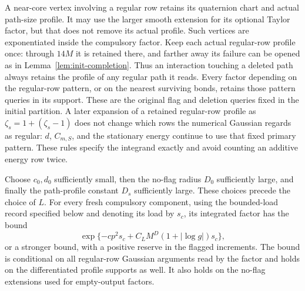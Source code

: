 A near-core vertex involving a regular row retains its quaternion chart
and actual path-size profile.  It may use the larger smooth extension
for its optional Taylor factor, but that does not remove its actual
profile.  Such vertices are exponentiated inside the compulsory factor.
Keep each actual regular-row profile once: through $14M$ it is retained
there, and farther away its failure can be opened as in
Lemma~\ref{lem:init-completion}.  Thus an interaction touching a deleted
path always retains the profile of any regular path it reads.  Every
factor depending on the regular-row pattern, or on the nearest surviving
bonds, retains those pattern queries in its support.  These are the original flag and deletion queries fixed in the initial
partition.  A later expansion of a retained regular-row profile as
$\zeta_s=1+(\zeta_s-1)$ does not change which rows the numerical
Gaussian regards as regular: $d$, $C_{m,S}$, and the stationary energy
continue to use that fixed primary pattern.  These rules specify the
integrand exactly and avoid counting an additive energy row twice.

\begin{lemma}
\label{lem:init-reserve}
Choose $c_0,d_0$ sufficiently small, then the no-flag radius $D_0$
sufficiently large, and finally the path-profile constant $D_s$
sufficiently large.  These choices precede the choice of $L$.
For every fresh compulsory component, using the bounded-load record
specified below and denoting its load by $s_c$, its integrated factor
has the bound
\[
 \exp\{-cp^2s_c+C_LM^D(1+|\log g|)s_c\},
\]
or a stronger bound, with a positive reserve in the flagged increments.
The bound is conditional on all regular-row Gaussian arguments read by
the factor and holds on the differentiated profile supports as well.
It also holds on the no-flag extensions used for empty-output factors.
\end{lemma}


